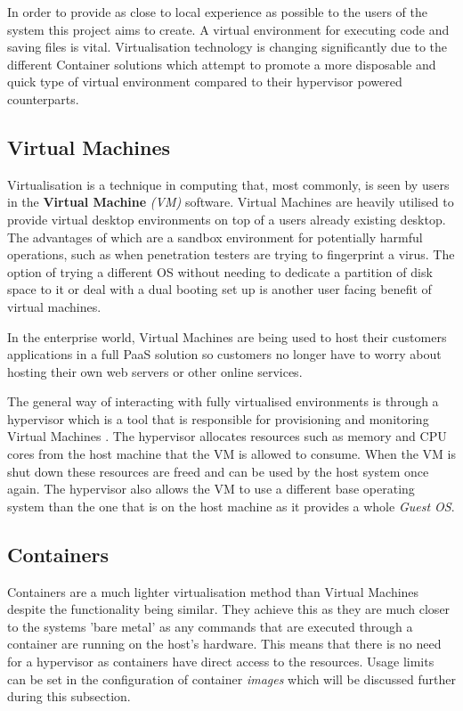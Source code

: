 In order to provide as close to local experience as possible to the users of the system this project aims to create. A virtual environment for executing code and saving files is vital. Virtualisation technology is changing significantly due to the different Container solutions which attempt to promote a more disposable and quick type of virtual environment compared to their hypervisor powered counterparts.

\subsection{Virtual Machines}

Virtualisation is a technique in computing that, most commonly, is seen by users in the \textbf{Virtual Machine} \textit{(VM)} software. Virtual Machines are heavily utilised to provide virtual desktop environments on top of a users already existing desktop. The advantages of which are a sandbox environment for potentially harmful operations, such as when penetration testers are trying to fingerprint a virus. The option of trying a different OS without needing to dedicate a partition of disk space to it or deal with a dual booting set up is another user facing benefit of virtual machines.

In the enterprise world, Virtual Machines are being used to host their customers applications in a full PaaS solution so customers no longer have to worry about hosting their own web servers or other online services.

The general way of interacting with fully virtualised environments is through a hypervisor which is a tool that is responsible for provisioning and monitoring Virtual Machines \cite{hypervisor}. The hypervisor allocates resources such as memory and CPU cores from the host machine that the VM is allowed to consume. When the VM is shut down these resources are freed and can be used by the host system once again. The hypervisor also allows the VM to use a different base operating system than the one that is on the host machine as it provides a whole \textit{Guest OS}.

\subsection{Containers}

Containers are a much lighter virtualisation method than  Virtual Machines despite the functionality being similar. They achieve this as they are much closer to the systems 'bare metal' as any commands that are executed through a container are running on the host's hardware. This means that there is no need for a hypervisor as containers have direct access to the resources. Usage limits can be set in the configuration of container \textit{images} which will be discussed further during this subsection.


